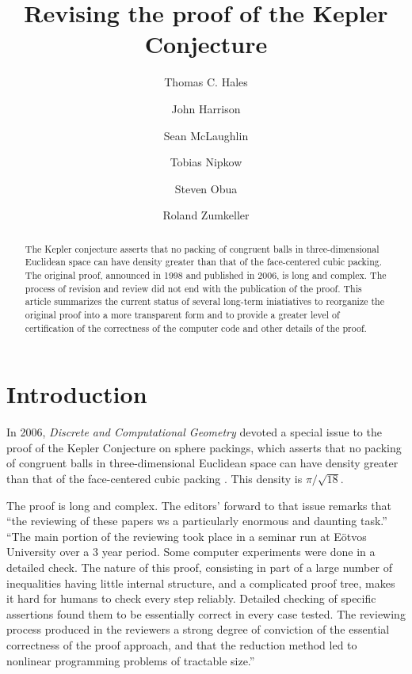 \documentclass[11pt]{amsart}
\begin{document}
\title{Revising the proof of the Kepler Conjecture}

\author[Hales]{Thomas C. Hales}
\address[T.~Hales]{Math Department, University of Pittsburgh}

\author[Harrison]{John Harrison}
\address[J.~Harrison]{Intel}

\author[McLaughlin]{Sean McLaughlin}
\address[S.~McLaughlin]{CMU}

\author[Nipkow]{Tobias Nipkow}
\address[T.~Nipkow]{TUM}

\author[Obua]{Steven Obua}
\address[S.~Obua]{TUM}

\author[Zumkeller]{Roland Zumkeller}
\address[R.~Zumkeller]{Palaiseau}

\begin{abstract}
The Kepler conjecture asserts that no packing of congruent balls in three-dimensional Euclidean space can
have density greater than that of the face-centered cubic packing.  The original proof,
announced in 1998 and published in 2006, is long and complex. The process of  revision and review did not end with the publication of the proof.
This article summarizes the current status of several long-term iniatiatives to
reorganize the original proof into a more transparent form and to provide a greater
level of certification of the correctness of the computer code and other details of the proof.
\end{abstract}


\maketitle

\section{Introduction}

In 2006, {\it Discrete and Computational Geometry} devoted a special issue to the
proof of the Kepler Conjecture on sphere packings, which asserts that no
packing of congruent balls in three-dimensional Euclidean space can
have density greater than that of the face-centered cubic packing \cite{Hales:2006:DCG}.
This density is $\pi/\sqrt{18}$.

The proof is long and complex.  The editors' forward to that issue remarks
that ``the reviewing of these papers ws a particularly enormous and daunting task.''
``The main portion of the reviewing took place in a seminar run at E\"otvos University
over a 3 year period.  Some computer experiments were done in a detailed check.
The nature of this proof, consisting in part of a large number of inequalities having
little internal structure, and a complicated proof tree, makes it hard for humans
to check every step reliably.  Detailed checking of specific assertions found them to
be essentially correct in every case tested.  The reviewing process produced in the
reviewers a strong degree of conviction of the essential correctness of the proof
approach, and that the reduction method led to nonlinear programming problems of
tractable size.''
\end{document}
